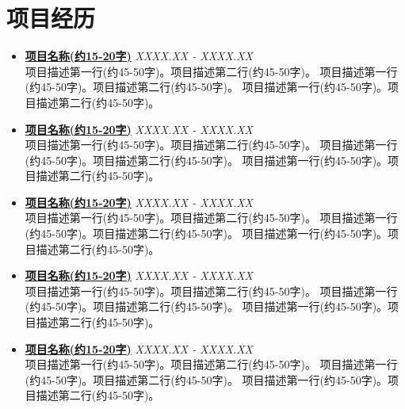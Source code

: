 \documentclass[a4paper]{article}
\begin{document}
\section*{项目经历}
\begin{itemize}[leftmargin=*,label={},itemsep=0.3em,topsep=0.1em]
\item \textbf{\href{项目链接}{项目名称(约15-20字)}} \hfill \textit{XXXX.XX - XXXX.XX}\\
项目描述第一行(约45-50字)。项目描述第二行(约45-50字)。
项目描述第一行(约45-50字)。项目描述第二行(约45-50字)。
项目描述第一行(约45-50字)。项目描述第二行(约45-50字)。


\item \textbf{\href{项目链接}{项目名称(约15-20字)}}  \hfill \textit{XXXX.XX - XXXX.XX}\\
项目描述第一行(约45-50字)。项目描述第二行(约45-50字)。
项目描述第一行(约45-50字)。项目描述第二行(约45-50字)。
项目描述第一行(约45-50字)。项目描述第二行(约45-50字)。


\item \textbf{\href{项目链接}{项目名称(约15-20字)}} \hfill \textit{XXXX.XX - XXXX.XX}\\
项目描述第一行(约45-50字)。项目描述第二行(约45-50字)。
项目描述第一行(约45-50字)。项目描述第二行(约45-50字)。
项目描述第一行(约45-50字)。项目描述第二行(约45-50字)。


\item \textbf{\href{项目链接}{项目名称(约15-20字)}} \hfill \textit{XXXX.XX - XXXX.XX}\\
项目描述第一行(约45-50字)。项目描述第二行(约45-50字)。
项目描述第一行(约45-50字)。项目描述第二行(约45-50字)。
项目描述第一行(约45-50字)。项目描述第二行(约45-50字)。


\item \textbf{\href{项目链接}{项目名称(约15-20字)}} \hfill \textit{XXXX.XX - XXXX.XX}\\
项目描述第一行(约45-50字)。项目描述第二行(约45-50字)。
项目描述第一行(约45-50字)。项目描述第二行(约45-50字)。
项目描述第一行(约45-50字)。项目描述第二行(约45-50字)。

\end{itemize}
\end{document}
